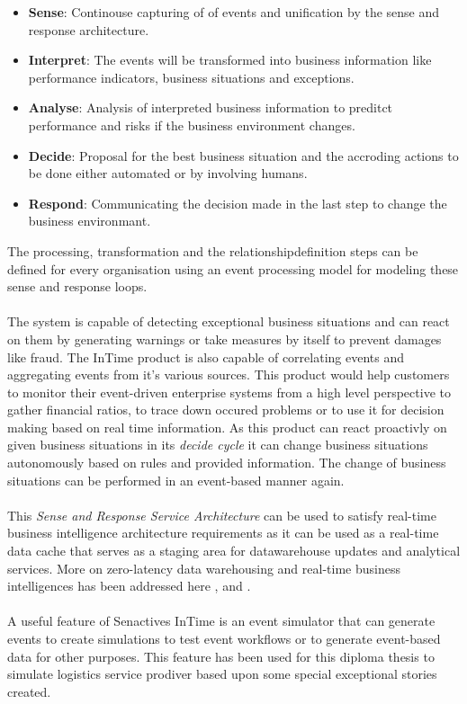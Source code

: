 \documentclass[a4paper,titlepage,11pt,DIV10,BCOR0.5cm,headinclude]{article}
\begin{document}
\begin{itemize}
	\item \textbf{Sense}: Continouse capturing of of events and unification by the sense and response architecture.
	\item \textbf{Interpret}: The events will be transformed into business information like performance indicators, business situations and exceptions.
	\item \textbf{Analyse}: Analysis of interpreted business information to preditct performance and risks if the business environment changes.
	\item \textbf{Decide}: Proposal for the best business situation and the accroding actions to be done either automated or by involving humans.
	\item \textbf{Respond}: Communicating the decision made in the last step to change the business environmant.
\end{itemize}

The processing, transformation and the relationshipdefinition steps can be defined for every organisation using an event processing model for modeling these sense and response loops.
\\\\
The system is capable of detecting exceptional business situations and can react on them by generating warnings or take measures by itself to prevent damages like fraud. The InTime product is also capable of correlating events and aggregating events from it's various sources. This product would help customers to monitor their event-driven enterprise systems from a high level perspective to gather financial ratios, to trace down occured problems or to use it for decision making based on real time information. As this product can react proactivly on given business situations in its \textit{decide cycle} it can change business situations autonomously based on rules and provided information. The change of business situations can be performed in an event-based manner again. 
\\\\
This \textit{Sense and Response Service Architecture} can be used to satisfy real-time business intelligence architecture requirements as it can be used as a real-time data cache that serves as a staging area for datawarehouse updates and analytical services. More on zero-latency data warehousing and real-time business intelligences has been addressed here \cite{TjoaNguyenKickinger04}, \cite{NguyenSchieferTjoa05} and \cite{ThoManhNguyen05}.
\\\\
A useful feature of Senactives InTime is an event simulator that can generate events to create simulations to test event workflows or to generate event-based data for other purposes. This feature has been used for this diploma thesis to simulate logistics service prodiver based upon some special exceptional stories created. 
\end{document}
